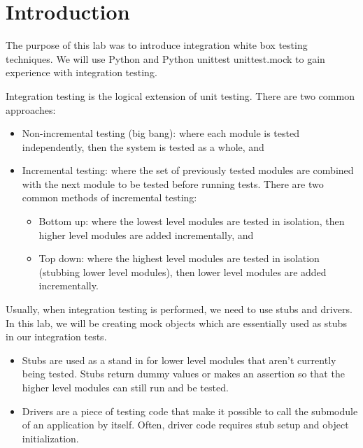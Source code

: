 \documentclass[12pt, letterpaper, titlepage]{article}
\title{\textbf{\Huge{
    \begin{center}
        ECE 322 Lab Report \#4
    \end{center}
}}}
\author{
\B enjamin Kong \\
1573684 \\
}
\begin{document}
 
\onehalfspacing

\maketitle
\newpage

\section*{Introduction}
The purpose of this lab was to introduce integration white box testing techniques. We will use Python and Python unittest unittest.mock to gain experience with integration testing.

Integration testing is the logical extension of unit testing. There are two common approaches:
\begin{itemize}
    \item Non-incremental testing (big bang): where each module is tested independently, then the system is tested as a whole, and
    \item Incremental testing: where the set of previously tested modules are combined with the next module to be tested before running tests. There are two common methods of incremental testing:
    \begin{itemize}
        \item Bottom up: where the lowest level modules are tested in isolation, then higher level modules are added incrementally, and
        \item Top down: where the highest level modules are tested in isolation (stubbing lower level modules), then lower level modules are added incrementally.
    \end{itemize}
\end{itemize}

Usually, when integration testing is performed, we need to use stubs and drivers. In this lab, we will be creating mock objects which are essentially used as stubs in our integration tests.
\begin{itemize}
    \item Stubs are used as a stand in for lower level modules that aren't currently being tested. Stubs return dummy values or makes an assertion so that the higher level modules can still run and be tested.
    \item Drivers are a piece of testing code that make it possible to call the submodule of an application by itself. Often, driver code requires stub setup and object initialization. 
\end{itemize}
\end{document}

